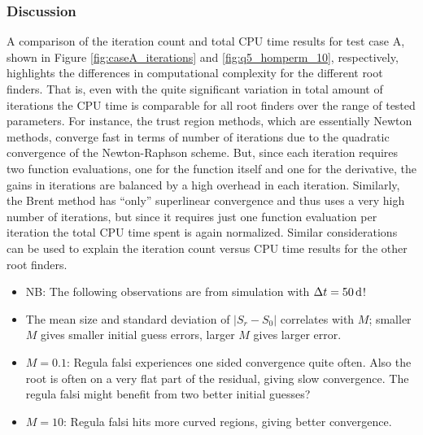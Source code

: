 \subsubsection{Discussion}
A comparison of the iteration count and total CPU time results for test case A, shown in Figure \ref{fig:caseA_iterations} and \ref{fig:q5_homperm_10}, respectively, highlights the differences in computational complexity for the different root finders. That is, even with the quite significant variation in total amount of iterations the CPU time is comparable for all root finders over the range of tested parameters. For instance, the trust region methods, which are essentially Newton methods, converge fast in terms of number of iterations due to the quadratic convergence of the Newton-Raphson scheme. But, since each iteration requires two function evaluations, one for the function itself and one for the derivative, the gains in iterations are balanced by a high overhead in each iteration. Similarly, the Brent method has ``only'' superlinear convergence and thus uses a very high number of iterations, but since it requires just one function evaluation per iteration the total CPU time spent is again normalized. Similar considerations can be used to explain the iteration count versus CPU time results for the other root finders.

\begin{itemize}
\item NB: The following observations are from simulation with $\Delta t = \unit[50]{d}$!
\item The mean size and standard deviation of $| S_r - S_0 |$ correlates with $M$; smaller $M$ gives smaller initial guess errors, larger $M$ gives larger error.
\item $M = 0.1$: Regula falsi experiences one sided convergence quite often. Also the root is often on a very flat part of the residual, giving slow convergence. The regula falsi might benefit from two better initial guesses?
\item $M = 10$: Regula falsi hits more curved regions, giving better convergence. 
\end{itemize}

\clearpage
